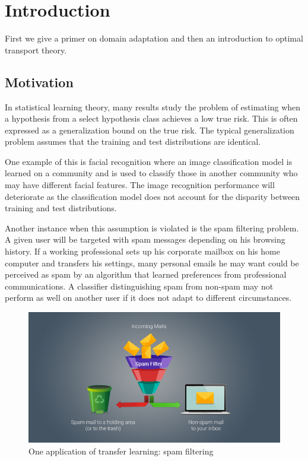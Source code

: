 \chapter{Introduction}
First we give a primer on domain adaptation and then an introduction to optimal transport theory.

\section{Motivation}

In statistical learning theory, many results study the problem of estimating when a hypothesis from a select hypothesis class achieves a low true risk. This is often expressed as a generalization bound on the true risk. The typical generalization problem assumes that the training and test distributions are identical. 

One example of this is facial recognition where an image classification model is learned on a community and is used to classify those in another community who may have different facial features. The image recognition performance will deteriorate as the classification model does not account for the disparity between training and test distributions. 

Another instance when this assumption is violated is the spam filtering problem. A given user will be targeted with spam messages depending on his browsing history. If a working professional sets up his corporate mailbox on his home computer and transfers his settings, many personal emails he may want could be perceived as spam by an algorithm that learned preferences from professional communications. A classifier distinguishing spam from non-spam may not perform as well on another user if it does not adapt to different circumstances.

\begin{figure}
	\centering
	\includegraphics[width=0.7\linewidth]{pictures/anti-spam-filtering-techniques.png}
	\caption{One application of transfer learning: spam filtering}
	\label{fig:datree}
\end{figure}

